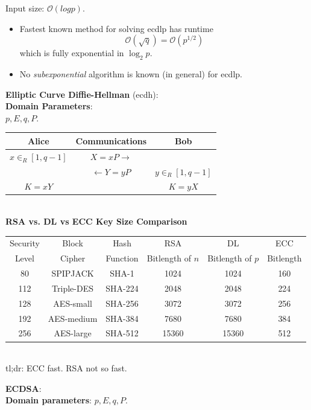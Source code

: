 \documentclass[a4paper,12pt]{article}
\begin{document}
Input size: $\mathcal O (log p)$.
\begin{itemize}
\item
Fastest known method for solving {\sc ecdlp} has runtime
$$
\mathcal O (\sqrt q) = \mathcal O (p^{1/2})
$$
which is fully exponential in $\log_2 p$.
\item
No {\it subexponential} algorithm is known (in general) for
{\sc ecdlp}.
\end{itemize}
{\bf Elliptic Curve Diffie-Hellman} ({\sc ecdh}):
\\[1em]
{\bf Domain Parameters}:
\\[1em]
$p,E,q,P$.
\begin{center}
\begin{tabular}{ c c c }
Alice & Communications               & Bob \\
\hline
$x\in_R[1,q-1]$       & $X=xP \to$   & \\
                      & $\gets Y=yP$ & $y\in_R[1,q-1]$ \\
$K=xY$                &              & $K=yX$
\end{tabular}
\end{center}
\ \\[1em]
{\bf RSA vs. DL vs ECC Key Size Comparison}
\begin{center}
\begin{tabular}{ c c c c c c }
Security & Block       & Hash      & RSA              & DL                 & ECC\\
Level    & Cipher      & Function  & Bitlength of $n$ & Bitlength of $p$   & Bitlength\\
\hline
80       & SPIPJACK    & SHA-1    & 1024              & 1024               & 160\\
112      & Triple-DES  & SHA-224  & 2048              & 2048               & 224\\
128      & AES-small   & SHA-256  & 3072              & 3072               & 256\\
192      & AES-medium  & SHA-384  & 7680              & 7680               & 384\\
256      & AES-large   & SHA-512  & 15360             & 15360              & 512\\
\end{tabular}
\\[1em]
{\sc tl;dr:} ECC fast.  RSA not so fast.
\end{center}
\clearpage
{\bf ECDSA}:
\\[1em]
{\bf Domain parameters}: $p,E,q,P$.
\\[1em]
\end{document}
